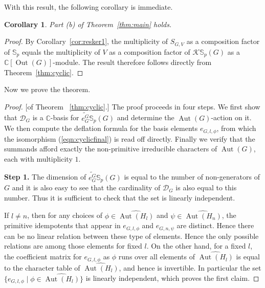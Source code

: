 \documentclass[12pt]{article}
\theoremstyle{plain}
\newtheorem{corollary}[theorem]{Corollary}
\theoremstyle{definition}
\newcommand{\kerlin}{\mathbb S_p}
\newcommand{\out}{\operatorname{Out}}
\newcommand{\Aut}{\operatorname{Aut}}
\begin{document}
\noindent With this result, the following corollary is immediate.
\begin{corollary}
Part \textnormal{(b)} of Theorem~\ref{thm:main} holds.
\end{corollary}
\begin{proof}
By Corollary~\ref{cor:resker1}, the multiplicity of $S_{G,V}$ as a composition factor of $\kerlin$ equals the multiplicity of $V$ as a composition factor of $\mathcal{K}\kerlin(G)$ as a $\mathbb C[\out(G)]$-module. The result therefore follows directly from Theorem~\ref{thm:cyclic}.
\end{proof}
\noindent Now we prove the theorem.
\begin{proof}{[of Theorem ~\ref{thm:cyclic}.]}
The proof proceeds in four steps. We first show that $\mathcal{D}_G$ is a $\mathbb C$-basis for $\widetilde{e_G^G}\kerlin(G)$ and determine the $\Aut(G)$-action on it. We then compute the deflation formula for the basis elements $e_{G,l,\phi}$, from which the isomorphism (\ref{eqn:cyclicfinal}) is read off directly. Finally we verify that the summands afford exactly the non-primitive irreducible characters of $\Aut(G)$, each with multiplicity $1$.

\textbf{Step 1.} The dimension of $\widetilde{e_G^G} \kerlin(G)$ is equal to the number of non-generators of $G$ and it is also easy to see that the cardinality of $\mathcal{D}_G$ is also equal to this number. Thus it is sufficient to check that the set is linearly independent.

If $l\not = n$, then for any choices of $\phi\in\widehat{\Aut(H_l)}$ and $\psi\in\widehat{\Aut(H_n)}$, the primitive idempotents that appear in $e_{G, l, \phi}$ and $e_{G, n, \psi}$ are distinct. Hence there can be no linear relation between these type of elements. Hence the only possible relations are among those elements for fixed $l$. On the other hand, for a fixed $l$, the coefficient matrix for $e_{G, l, \phi}$ as $\phi$ runs over all elements of $\widehat{\Aut(H_l)}$ is equal to the character table of $\widehat{\Aut(H_l)}$, and hence is invertible. In particular the set $\{ e_{G, l, \phi} \mid \phi\in\widehat{\Aut(H_l)}\}$ is linearly independent, which proves the first claim.


\end{proof}
\end{document}
